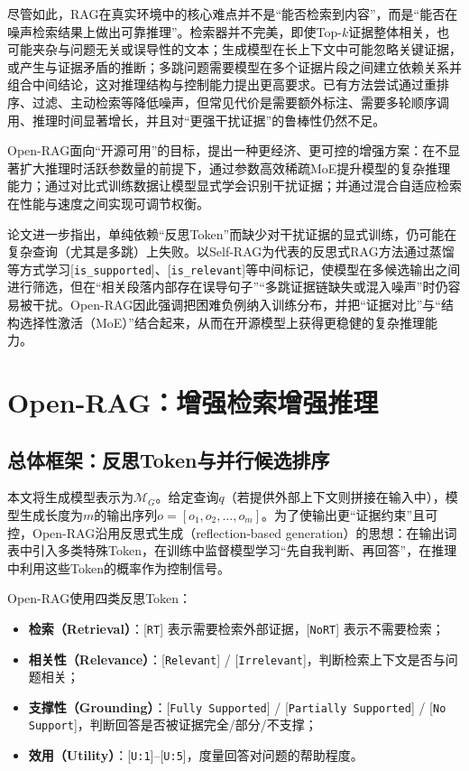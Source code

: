 尽管如此，RAG在真实环境中的核心难点并不是“能否检索到内容”，而是“能否在噪声检索结果上做出可靠推理”。检索器并不完美，即使Top-$k$证据整体相关，也可能夹杂与问题无关或误导性的文本；生成模型在长上下文中可能忽略关键证据，或产生与证据矛盾的推断；多跳问题需要模型在多个证据片段之间建立依赖关系并组合中间结论，这对推理结构与控制能力提出更高要求。已有方法尝试通过重排序、过滤、主动检索等降低噪声，但常见代价是需要额外标注、需要多轮顺序调用、推理时间显著增长，并且对“更强干扰证据”的鲁棒性仍然不足。
 
Open-RAG面向“开源可用”的目标，提出一种更经济、更可控的增强方案：在不显著扩大推理时活跃参数量的前提下，通过参数高效稀疏MoE提升模型的复杂推理能力；通过对比式训练数据让模型显式学会识别干扰证据；并通过混合自适应检索在性能与速度之间实现可调节权衡。

论文进一步指出，单纯依赖“反思Token”而缺少对干扰证据的显式训练，仍可能在复杂查询（尤其是多跳）上失败。以Self-RAG为代表的反思式RAG方法通过蒸馏等方式学习[\texttt{is\_supported}]、[\texttt{is\_relevant}]等中间标记，使模型在多候选输出之间进行筛选，但在“相关段落内部存在误导句子”“多跳证据链缺失或混入噪声”时仍容易被干扰。Open-RAG因此强调把困难负例纳入训练分布，并把“证据对比”与“结构选择性激活（MoE）”结合起来，从而在开源模型上获得更稳健的复杂推理能力。
 
\section{Open-RAG：增强检索增强推理}
\subsection{总体框架：反思Token与并行候选排序}
本文将生成模型表示为$\mathcal{M}_{G}$。给定查询$q$（若提供外部上下文则拼接在输入中），模型生成长度为$m$的输出序列$o=[o_1,o_2,\dots,o_m]$。为了使输出更“证据约束”且可控，Open-RAG沿用反思式生成（reflection-based generation）的思想：在输出词表中引入多类特殊Token，在训练中监督模型学习“先自我判断、再回答”，在推理中利用这些Token的概率作为控制信号。
 
Open-RAG使用四类反思Token：
 
\begin{itemize}
    \item \textbf{检索（Retrieval）}：[\texttt{RT}] 表示需要检索外部证据，[\texttt{NoRT}] 表示不需要检索；
    \item \textbf{相关性（Relevance）}：[\texttt{Relevant}] / [\texttt{Irrelevant}]，判断检索上下文是否与问题相关；
    \item \textbf{支撑性（Grounding）}：[\texttt{Fully Supported}] / [\texttt{Partially Supported}] / [\texttt{No Support}]，判断回答是否被证据完全/部分/不支撑；
    \item \textbf{效用（Utility）}：[\texttt{U:1}]--[\texttt{U:5}]，度量回答对问题的帮助程度。
\end{itemize}


